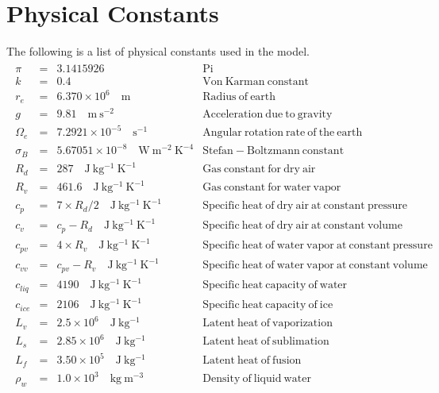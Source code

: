 \chapter{Physical Constants}
\label{physical_constants}

The following is a list of physical constants used in the model.
\\[3ex]

\begin{eqnarray*}
\begin{array}{lcll}
\pi & = & 3.1415926 & \mathrm{Pi} \\
k & = & 0.4  & \mathrm{Von \: Karman \: constant} \\
r_e & = & 6.370 \times 10^{6} \quad\mathrm{m} & \mathrm{ Radius \: of \: earth} \\
g & = & 9.81 \quad\mathrm{m \: s^{-2}} & \mathrm{ Acceleration \: due \: to \: gravity}\\
\Omega_{e} & = & 7.2921 \times 10^{-5} \quad\mathrm{s^{-1}} & \mathrm{ Angular \: rotation \: rate \: of \: the \: earth}\\
\sigma_{B} & = & 5.67051 \times 10^{-8} \quad\mathrm{W \: m^{-2} \: K^{-4}} & \mathrm{ Stefan-Boltzmann \: constant}\\
R_{d} & = & 287 \quad\mathrm{J \: kg^{-1} \: K^{-1}} & \mathrm{ Gas \: constant \: for \: dry \: air}\\
R_{v} & = & 461.6 \quad\mathrm{J \: kg^{-1} \: K^{-1}} & \mathrm{ Gas \: constant \: for \: water \: vapor}\\
c_{p} & = & 7 \times R_{d}/2 \quad\mathrm{J \: kg^{-1} \: K^{-1}} & \mathrm{ Specific \: heat \: of \: dry \: air \: at \: constant \: pressure}\\
c_{v} & = & c_{p}-R_{d} \quad\mathrm{J \: kg^{-1} \: K^{-1}} & \mathrm{ Specific \: heat \: of \: dry \: air \: at \: constant \: volume}\\
c_{pv} & = & 4 \times R_{v} \quad\mathrm{J \: kg^{-1} \: K^{-1}} & \mathrm{ Specific \: heat \: of \: water \: vapor \: at \: constant \: pressure}\\
c_{vv} & = & c_{pv}-R_{v} \quad\mathrm{J \: kg^{-1} \: K^{-1}} & \mathrm{ Specific \: heat \: of \: water \: vapor \: at \: constant \: volume}\\
c_{liq} & = & 4190 \quad\mathrm{J \: kg^{-1} \: K^{-1}} & \mathrm{ Specific \: heat \: capacity \: of \: water}\\
c_{ice} & = & 2106 \quad\mathrm{J \: kg^{-1} \: K^{-1}} & \mathrm{ Specific \: heat \: capacity \: of \: ice}\\
L_{v} & = & 2.5 \times 10^{6} \quad\mathrm{J \: kg^{-1}} & \mathrm{ Latent \: heat \: of \: vaporization}\\
L_{s} & = & 2.85 \times 10^{6} \quad\mathrm{J \: kg^{-1}} & \mathrm{ Latent \: heat \: of \: sublimation}\\
L_{f} & = & 3.50 \times 10^{5} \quad\mathrm{J \: kg^{-1}} & \mathrm{ Latent \: heat \: of \: fusion}\\
\rho_{w} & = & 1.0 \times 10^{3} \quad\mathrm{kg \: m^{-3}} & \mathrm{ Density \: of \: liquid \: water}\\
\end{array}
\end{eqnarray*}

